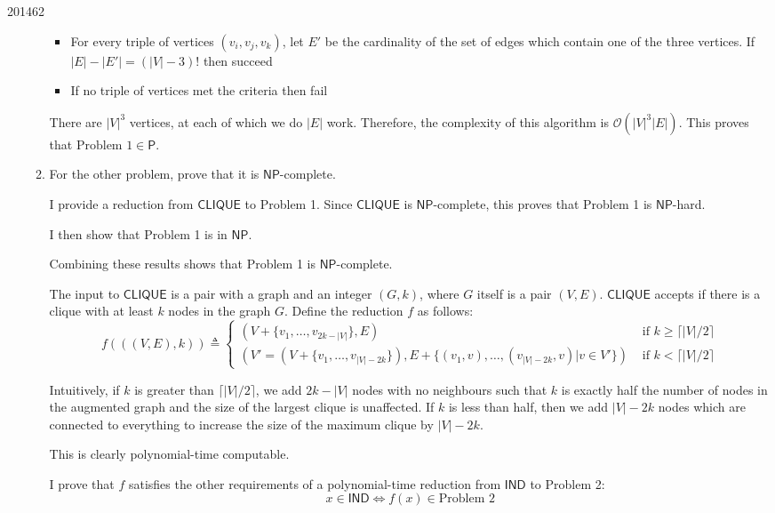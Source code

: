 \documentclass[10pt,\jkfside,a4paper]{article}
\begin{document}
\begin{examquestion}{2014}{6}{2}
\begin{enumerate}[label=(\alph*)]
\begin{enumerate}[label=(\roman*)]
\begin{itemize}

\item For every triple of vertices $(v_i, v_j, v_k)$, let $E'$ be the
cardinality of the set of edges which contain one of the three vertices. If
$|E| - |E'| = (|V| - 3)!$ then succeed

\item If no triple of vertices met the criteria then fail

\end{itemize}

There are $|V|^3$ vertices, at each of which we do $|E|$ work. Therefore,
the complexity of this algorithm is $\mathcal O(|V|^3|E|)$. This proves that
$\text{Problem 1} \in \mathsf{P}$.

\item For the other problem, prove that it is $\mathsf{NP}$-complete.

I provide a reduction from $\mathsf{CLIQUE}$ to Problem 1. Since
$\mathsf{CLIQUE}$ is $\mathsf{NP}$-complete, this proves that
Problem 1 is $\mathsf{NP}$-hard.

I then show that Problem 1 is in $\mathsf{NP}$.

Combining these results shows that Problem 1 is $\mathsf{NP}$-complete.

The input to $\mathsf{CLIQUE}$ is a pair with a graph and an integer
$(G, k)$, where $G$ itself is a pair $(V, E)$. $\mathsf{CLIQUE}$ accepts if
there is a clique with at least $k$ nodes in the graph $G$. Define the
reduction $f$ as follows:
\[
f(((V, E), k)) \triangleq
\begin{cases}
(V + \{v_1, \dots, v_{2k - |V|}\}, E) & \text{ if } k \ge \lceil|V|/2\rceil \\
(V' = (V + \{v_1, \dots, v_{|V| - 2k}\}), E + \{(v_1, v), \dots, (v_{|V| - 2k}, v)|v \in
V'\}) & \text{ if } k < \lceil|V|
/2\rceil
\end{cases}
\]

Intuitively, if $k$ is greater than $\lceil |V|/2\rceil$, we add $2k - |V|$
nodes with no neighbours such that $k$ is exactly half the number of nodes
in the augmented graph and the size of the largest clique is unaffected.
If $k$ is less than half, then we add $|V| - 2k$ nodes which are connected
to everything to increase the size of the maximum clique by $|V| - 2k$.

This is clearly polynomial-time computable.

I prove that $f$ satisfies the other requirements of a polynomial-time
reduction from $\mathsf{IND}$ to Problem 2:
\[
x \in \mathsf{IND} \iff f(x) \in \text{Problem 2}
\]


\end{enumerate}
\end{enumerate}
\end{examquestion}
\end{document}
